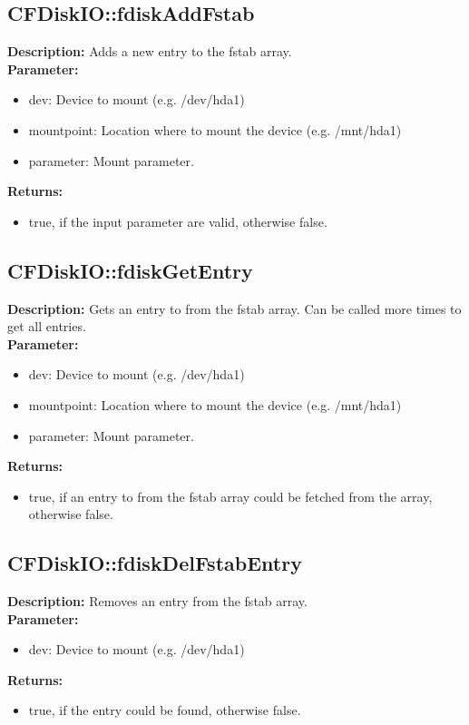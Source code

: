 \subsection{CFDiskIO::fdiskAddFstab}
\textbf{Description:} Adds a new entry to the fstab array.\\
\textbf{Parameter:}
\begin{itemize}
\item dev: Device to mount (e.g. /dev/hda1)
\item mountpoint: Location where to mount the device (e.g. /mnt/hda1)
\item parameter: Mount parameter.
\end{itemize}
\textbf{Returns:}
\begin{itemize}
\item true, if the input parameter are valid, otherwise false.
\end{itemize}

\subsection{CFDiskIO::fdiskGetEntry}
\textbf{Description:} Gets an entry to from the fstab array. Can be called more times to get all entries.\\
\textbf{Parameter:}
\begin{itemize}
\item dev: Device to mount (e.g. /dev/hda1)
\item mountpoint: Location where to mount the device (e.g. /mnt/hda1)
\item parameter: Mount parameter.
\end{itemize}
\textbf{Returns:}
\begin{itemize}
\item true, if an entry to from the fstab array could be fetched from the array, otherwise false.
\end{itemize}

\subsection{CFDiskIO::fdiskDelFstabEntry}
\textbf{Description:} Removes an entry from the fstab array.\\
\textbf{Parameter:}
\begin{itemize}
\item dev: Device to mount (e.g. /dev/hda1)
\end{itemize}
\textbf{Returns:}
\begin{itemize}
\item true, if the entry could be found, otherwise false.
\end{itemize}

